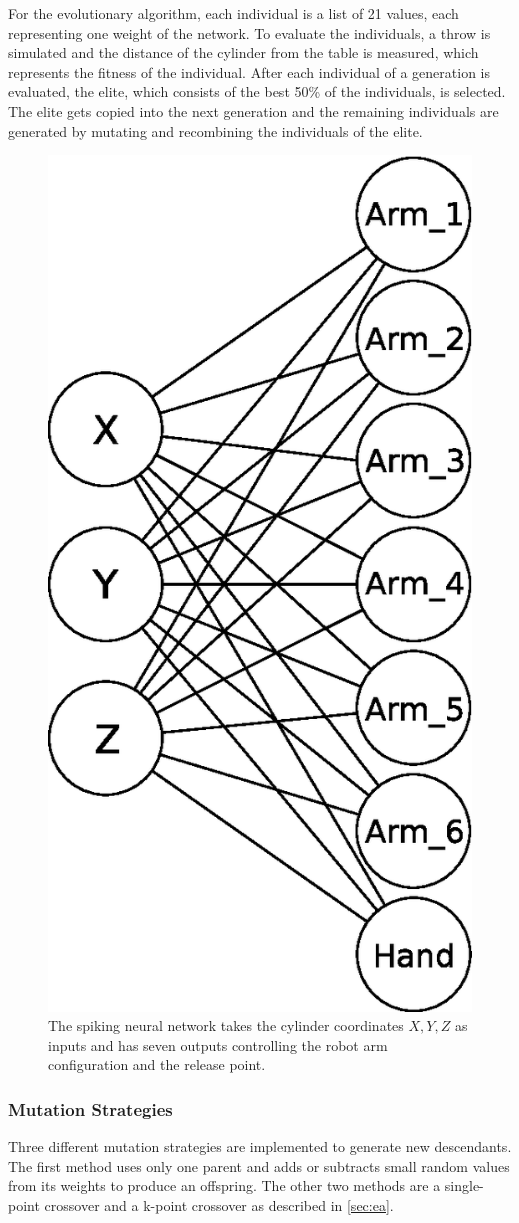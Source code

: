 For the evolutionary algorithm, each individual is a list of 21 values, each representing one weight of the network.
To evaluate the individuals, a throw is simulated and the distance of the cylinder from the table is measured, which represents the fitness of the individual.
After each individual of a generation is evaluated, the elite, which consists of the best 50\% of the individuals, is selected.
The elite gets copied into the next generation and the remaining individuals are generated by mutating and recombining the individuals of the elite.

\begin{figure}[h]
\centering
\includegraphics[width=.5\columnwidth]{figures/net.eps}
\caption{The spiking neural network takes the cylinder coordinates $X, Y, Z$ as inputs and has seven outputs controlling the robot arm configuration and the release point.}
\label{fig:network}
\end{figure}

\subsubsection{Mutation Strategies}
Three different mutation strategies are implemented to generate new descendants.
The first method uses only one parent and adds or subtracts small random values from its weights to produce an offspring.
The other two methods are a single-point crossover and a k-point crossover as described in \autoref{sec:ea}.

